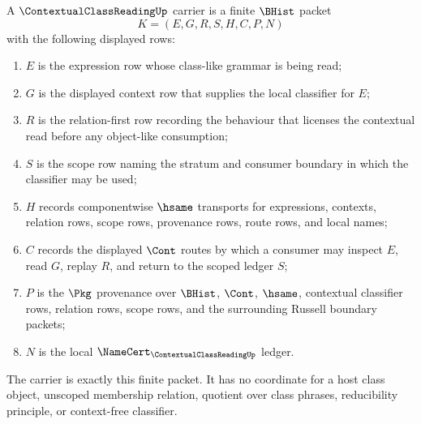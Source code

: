 \begin{definition}
\label{def:contextual-class-reading-carrier}
A $\ContextualClassReadingUp$ carrier is a finite $\BHist$ packet
$$
K=(E,G,R,S,H,C,P,N)
$$
with the following displayed rows:
\begin{enumerate}
\item $E$ is the expression row whose class-like grammar is being read;
\item $G$ is the displayed context row that supplies the local classifier for $E$;
\item $R$ is the relation-first row recording the behaviour that licenses the contextual read before any object-like consumption;
\item $S$ is the scope row naming the stratum and consumer boundary in which the classifier may be used;
\item $H$ records componentwise $\hsame$ transports for expressions, contexts, relation rows, scope rows, provenance rows, route rows, and local names;
\item $C$ records the displayed $\Cont$ routes by which a consumer may inspect $E$, read $G$, replay $R$, and return to the scoped ledger $S$;
\item $P$ is the $\Pkg$ provenance over $\BHist$, $\Cont$, $\hsame$, contextual classifier rows, relation rows, scope rows, and the surrounding Russell boundary packets;
\item $N$ is the local $\NameCert_{\ContextualClassReadingUp}$ ledger.
\end{enumerate}
The carrier is exactly this finite packet. It has no coordinate for a host class object, unscoped membership relation, quotient over class phrases, reducibility principle, or context-free classifier.
\end{definition}

